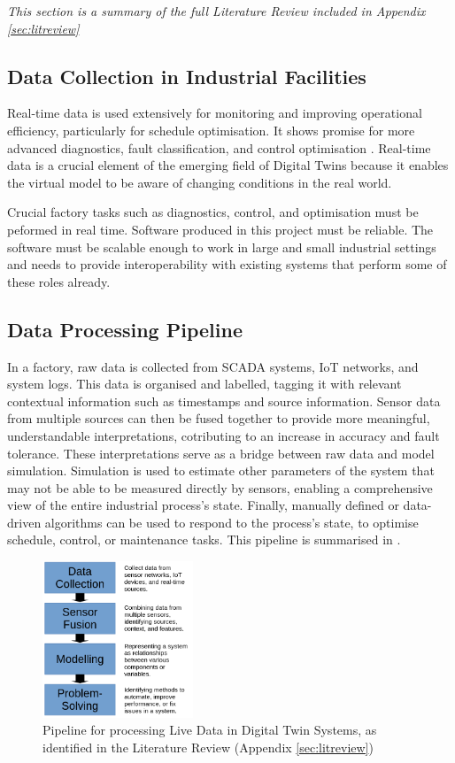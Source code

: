 \textit{This section is a summary of the full Literature Review included in Appendix \ref{sec:litreview}}


\subsection{Data Collection in Industrial Facilities}

Real-time data is used extensively for monitoring and improving operational efficiency, particularly for schedule optimisation. It shows promise for more advanced diagnostics, fault classification, and control optimisation \cite{udugamaRoleBigData2020}. Real-time data is a crucial element of the emerging field of Digital Twins because it enables the virtual model to be aware of changing conditions in the real world.

Crucial factory tasks such as diagnostics, control, and optimisation must be peformed in real time. Software produced in this project must be reliable.
The software must be scalable enough to work in large and small industrial settings and needs to provide interoperability with existing systems that perform some of these roles already.


\subsection{Data Processing Pipeline}

In a factory, raw data is collected from SCADA systems, IoT networks, and system logs. 
This data is organised and labelled, tagging it with relevant contextual information such as timestamps and source information. Sensor data from multiple sources can then be fused together to provide more meaningful, understandable interpretations, cotributing to an increase in accuracy and fault tolerance. 
These interpretations serve as a bridge between raw data and model simulation. Simulation is used to estimate other parameters of the system that may not be able to be measured directly by sensors, enabling a comprehensive view of the entire industrial process's state. 
Finally, manually defined or data-driven algorithms can be used to respond to the process's state, to optimise schedule, control, or maintenance tasks. 
This pipeline is summarised in .

\begin{figure}[h]
    \centering
    \includegraphics[width=0.4\textwidth]{LR_summary.png}
    \caption{Pipeline for processing Live Data in Digital Twin Systems, as identified in the Literature Review (Appendix \ref{sec:litreview})}
    \label{fig:processing_pipeline}
\end{figure}

